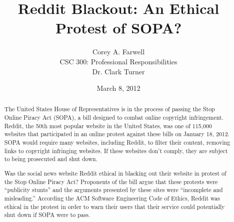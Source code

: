 \documentclass[11pt]{article}
\begin{document}
\title{\vfill Reddit Blackout: An Ethical Protest of SOPA?}
\author{
Corey A. Farwell\vspace{10pt} \\
CSC 300: Professional Responsibilities\vspace{10pt} \\
Dr. Clark Turner\vspace{10pt} \\
}
\date{March 8, 2012}

\maketitle

\vfill  %
\begin{abstract}

The United States House of Representatives is in the process of passing the Stop Online Piracy Act (SOPA), a bill designed to combat online copyright infringement.\cite{sopa} Reddit, the 50th most popular website in the United States, was one of 115,000 websites that participated in an online protest against these bills on January 18, 2012.\cite{nyt-sopa-protest} SOPA would require many websites, including Reddit, to filter their content, removing links to copyright infringing websites. If these websites don't comply, they are subject to being prosecuted and shut down.\cite{sopa}

Was the social news website Reddit ethical in blacking out their website in protest of the Stop Online Piracy Act? Proponents of the bill argue that these protests were ``publicity stunts'' and the arguments presented by these sites were ``incomplete and misleading.''\cite{lamar-smith-publicity-stunt}\cite{chris-dodd-response} According the ACM Software Engineering Code of Ethics,\cite{se-code} Reddit was ethical in the protest in order to warn their users that their service could potentially shut down if SOPA were to pass.

\end{abstract}

\thispagestyle{empty} %
\newpage


\thispagestyle{empty}  %
\tableofcontents

\newpage
\end{document}
